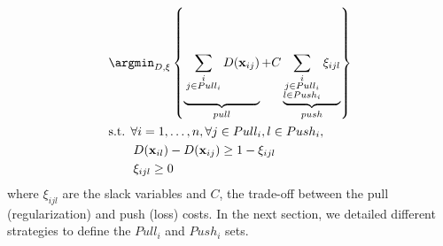 \begin{equation}
\begin{aligned}
&\displaystyle 		\argmin_{D,\xi} \left\lbrace \underbrace{
	\vphantom{ \sum\limits_{\substack{i \\ j \in Pull_i \\ l \in Push_i}}  \xi_{ijl} }
	\sum_{\substack{i \\ j \in Pull_i}}D(\textbf{x}_{ij})
}_{pull}
+ C
\underbrace{
	\sum\limits_{\substack{i \\ j \in Pull_i \\ l \in Push_i}} \xi_{ijl}
}
_{push} \right\rbrace  \\
&\text{s.t.  } \forall i = 1, \ldots, n, \forall j \in Pull_i, l \in Push_i, \\
& \qquad D(\textbf{x}_{il})-D(\textbf{x}_{ij}) \geq 1-\xi_{ijl} \\
& \qquad \xi_{ijl} \geq 0 
\label{eq:OriginalOptimizationProblem_Objective} 
\end{aligned}
\end{equation}
\noindent where $\xi_{ijl}$ are the slack variables and $C$, the trade-off between the pull (regularization) and push (loss) costs. In the next section, we detailed different strategies to define the $Pull_i$ and $Push_i$ sets. 


\newpage
